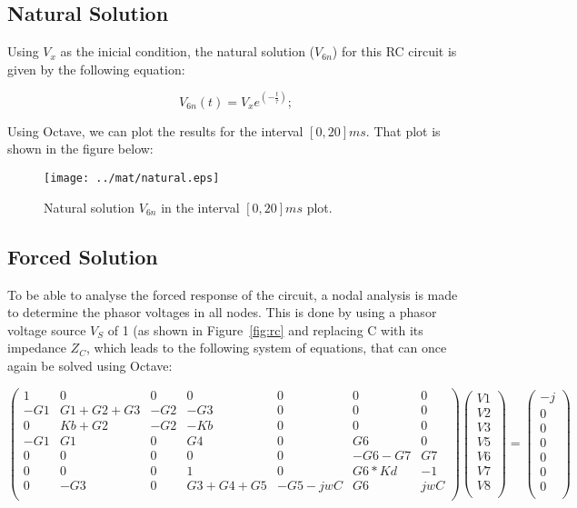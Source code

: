 \subsection{Natural Solution}


Using $V_x$ as the inicial condition, the natural solution ($V_{6n}$) for this RC circuit is given by the following equation:

\newcommand{\euler}{e}

\begin{equation}
	V_{6n}(t)=V_x e^{(-\frac{t}{\tau})};
\end{equation}

Using Octave, we can plot the results for the interval $[0, 20]ms$. That plot is shown in the figure below:


\begin{figure}[h] \centering
\texttt{[image: ../mat/natural.eps]}
	\caption{Natural solution $V_{6n}$ in the interval $[0, 20]ms$ plot.}
\label{fig:natural}
\end{figure}


\subsection{Forced Solution}

To be able to analyse the forced response of the circuit, a nodal analysis is made to determine the phasor voltages in all nodes. This is done by using a phasor voltage source $V_S$ of 1 (as shown in Figure~\ref{fig:rc} and replacing C with its impedance $Z_C$, which leads to the following system of equations, that can once again be solved using Octave:

\begin{equation}
\begin{pmatrix}
1 & 0 & 0 & 0 & 0 & 0 & 0\\
-G1 & G1+G2+G3 & -G2 & -G3 & 0 & 0 & 0\\
0 & Kb+G2 & -G2 & -Kb & 0 & 0 & 0\\
-G1 & G1 & 0 & G4 & 0 & G6 & 0\\
0 & 0 & 0 & 0 & 0 & -G6-G7 & G7\\
0 & 0 & 0 & 1 & 0 & G6*Kd & -1\\
0 & -G3 & 0 & G3+G4+G5 & -G5-jwC & G6 & jwC\\
\end{pmatrix}
\begin{pmatrix}
V1\\
V2\\
V3\\
V5\\
V6\\
V7\\
V8\\
\end{pmatrix}
=
\begin{pmatrix}
-j\\
0\\
0\\
0\\
0\\
0\\
0\\
\end{pmatrix}
\end{equation}


